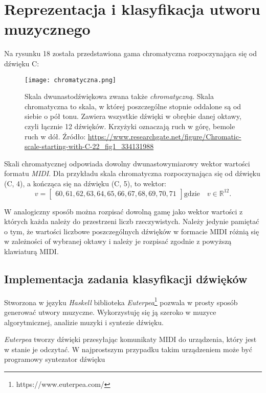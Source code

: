 \chapter{Reprezentacja i klasyfikacja utworu muzycznego}

Na rysunku 18 została przedstawiona gama chromatyczna rozpoczynająca się od dźwięku C:
\begin{figure}[H]
\texttt{[image: chromatyczna.png]}
\centering
\caption{Skala dwunastodźwiękowa zwana także  \textit{chromatyczną}. Skala chromatyczna to skala, w której poszczególne stopnie oddalone są od siebie o pół tonu. Zawiera wszystkie dźwięki w obrębie danej oktawy, czyli łącznie 12 dźwięków. Krzyżyki oznaczają ruch w górę, bemole ruch w dół. Źródło: \url{https://www.researchgate.net/figure/Chromatic-scale-starting-with-C-22_fig1_334131988}}
\centering
\end{figure}
Skali chromatycznej odpowiada dowolny dwunastowymiarowy wektor wartości formatu \textit{MIDI}. Dla przykładu skala chromatyczna rozpoczynająca się od dźwięku (C, 4), a kończąca się na dźwięku (C, 5), to wektor:
\begin{equation*}
v =
\begin{bmatrix}
60,61,62,63,64,65,66,67,68,69,70,71
\end{bmatrix}
\text{gdzie} \quad v \in \mathbb{R}^{12}.
\end{equation*}

W analogiczny sposób można rozpisać dowolną gamę jako wektor wartości z których każda należy do przestrzeni liczb rzeczywistych. Należy jedynie pamiętać o tym, że wartości liczbowe poszczególnych dźwięków w formacie MIDI różnią się  w zależności of wybranej oktawy i należy je rozpisać zgodnie z powyższą klawiaturą MIDI.



\section{Implementacja zadania klasyfikacji dźwięków}

Stworzona w języku \textit{Haskell} biblioteka \textit{Euterpea}\footnote{https://www.euterpea.com/} pozwala w prosty sposób generować utwory muzyczne. Wykorzystuję się ją szeroko w muzyce algorytmicznej, analizie muzyki i syntezie dźwięku.

\textit{Euterpea} tworzy dźwięki przesyłając komunikaty MIDI do urządzenia, który jest w stanie je odczytać. W najprostszym przypadku takim urządzeniem może być programowy syntezator dźwięku \citep{Obrebski2020}

